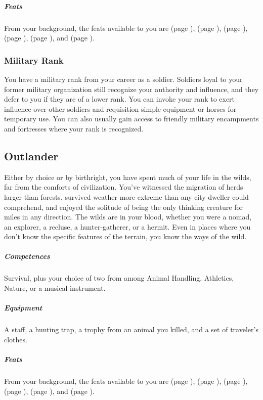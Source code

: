     \subparagraph{Feats} From your background, the feats available to you are
    \textbf{} (page \pageref{feat::}),
    \textbf{} (page \pageref{feat::}),
    \textbf{} (page \pageref{feat::}),
    \textbf{} (page \pageref{feat::}),
    \textbf{} (page \pageref{feat::}), and
    \textbf{} (page \pageref{feat::}).

    \subsubsection{Military Rank}
        You have a military rank from your career as a soldier.
        Soldiers loyal to your former military organization still recognize your authority and influence, and they defer to you if they are of a lower rank.
        You can invoke your rank to exert influence over other soldiers and requisition simple equipment or horses for temporary use.
        You can also usually gain access to friendly military encampments and fortresses where your rank is recognized.

\subsection*{Outlander} \label{ssec::outlander}
    Either by choice or by birthright, you have spent much of your life in the wilds, far from the comforts of civilization.
    You've witnessed the migration of herds larger than forests, survived weather more extreme than any city-dweller could comprehend, and enjoyed the solitude of being the only thinking creature for miles in any direction.
    The wilds are in your blood, whether you were a nomad, an explorer, a recluse, a hunter-gatherer, or a hermit.
    Even in places where you don't know the specific features of the terrain, you know the ways of the wild.

    \subparagraph{Competences} Survival, plus your choice of two from among Animal Handling, Athletics, Nature, or a musical instrument.

    \subparagraph{Equipment} A staff, a hunting trap, a trophy from an animal you killed, and a set of traveler's clothes.

    \subparagraph{Feats} From your background, the feats available to you are
    \textbf{} (page \pageref{feat::}),
    \textbf{} (page \pageref{feat::}),
    \textbf{} (page \pageref{feat::}),
    \textbf{} (page \pageref{feat::}),
    \textbf{} (page \pageref{feat::}), and
    \textbf{} (page \pageref{feat::}).


